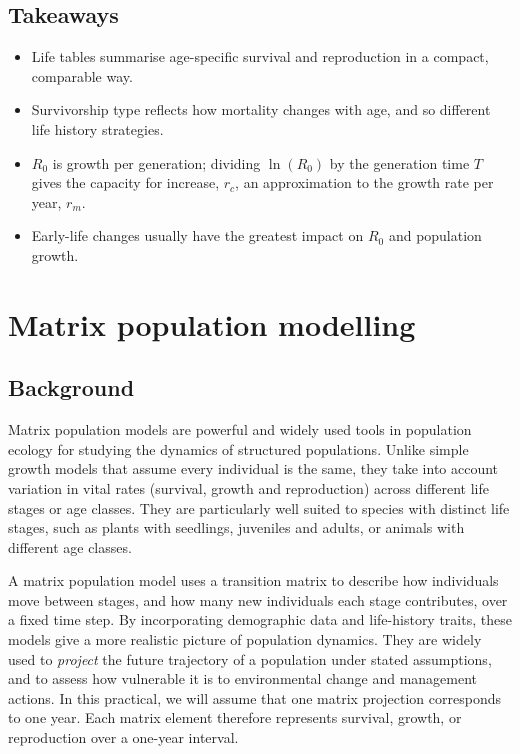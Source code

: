 \documentclass[
  a4paper]{book}
\providecommand{\tightlist}{%
  \setlength{\itemsep}{0pt}\setlength{\parskip}{0pt}}
\begin{document}
\section{Takeaways}\label{takeaways-7}

\begin{itemize}
\tightlist
\item
  Life tables summarise age-specific survival and reproduction in a compact, comparable way.
\item
  Survivorship type reflects how mortality changes with age, and so different life history strategies.
\item
  \(R_0\) is growth per generation; dividing \(\ln(R_0)\) by the generation time \(T\) gives the capacity for increase, \(r_c\), an approximation to the growth rate per year, \(r_m\).
\item
  Early-life changes usually have the greatest impact on \(R_0\) and population growth.
\end{itemize}

\chapter{Matrix population modelling}\label{matrix-population-modelling}

\section{Background}\label{background-8}

Matrix population models are powerful and widely used tools in population ecology for studying the dynamics of structured populations. Unlike simple growth models that assume every individual is the same, they take into account variation in vital rates (survival, growth and reproduction) across different life stages or age classes. They are particularly well suited to species with distinct life stages, such as plants with seedlings, juveniles and adults, or animals with different age classes.

A matrix population model uses a transition matrix to describe how individuals move between stages, and how many new individuals each stage contributes, over a fixed time step. By incorporating demographic data and life-history traits, these models give a more realistic picture of population dynamics. They are widely used to \emph{project} the future trajectory of a population under stated assumptions, and to assess how vulnerable it is to environmental change and management actions. In this practical, we will assume that one matrix projection corresponds to one year. Each matrix element therefore represents survival, growth, or reproduction over a one-year interval.
\end{document}
